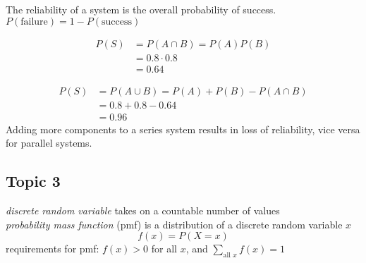 \documentclass[landscape,10pt]{article}
\begin{document}
\begin{multicols*}{2}
		The reliability of a system is the overall probability of success.\\
		$ P(\text{failure}) = 1- P(\text{success}) $

		\begin{center}
		\end{center}	
		\vspace{-10mm}
			\begin{align*}
				P(S) &= P(A \cap B) = P(A) P(B) \\
				 &= 0.8 \cdot 0.8\\
				 &= 0.64
			\end{align*}
		\vspace{-10mm}
		\begin{center}
		\end{center}
			\vspace{-10mm}
			\begin{align*}
				P(S) &= P(A \cup B) = P(A) + P(B) - P(A \cap B)\\
				&= 0.8 + 0.8 - 0.64\\
				&= 0.96 
			\end{align*}
	Adding more components to a series system results in loss of reliability, vice versa for parallel systems.

	\newpage
	
	\subsection*{Topic 3}
		
	\textit{discrete random variable} takes on a countable number of values\\
	\textit{probability mass function} (pmf) is a distribution of a discrete random variable $ x $
	\[ f(x) = P(X = x) \]
	requirements for pmf: $ f(x) > 0 $ for all $ x $, and $ \sum\limits_{\text{all } x}^{} f(x) = 1 $\\
	

\end{multicols*}
\end{document}
